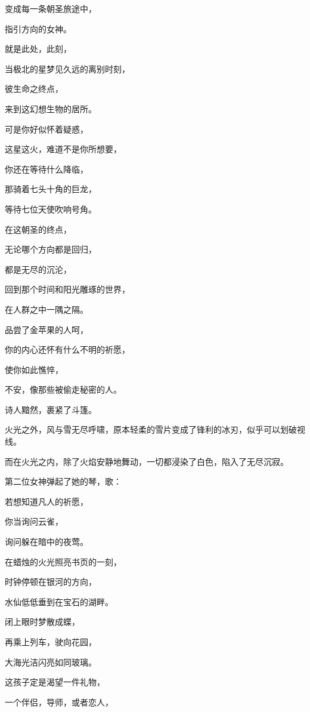 \documentclass[UTF8]{article}
\begin{document}
\par 变成每一条朝圣旅途中，
\par 指引方向的女神。
\par 就是此处，此刻，
\par 当极北的星梦见久远的离别时刻，
\par 彼生命之终点，
\par 来到这幻想生物的居所。
\par 可是你好似怀着疑惑，
\par 这星这火，难道不是你所想要，
\par 你还在等待什么降临，
\par 那骑着七头十角的巨龙，
\par 等待七位天使吹响号角。
\par 在这朝圣的终点，
\par 无论哪个方向都是回归，
\par 都是无尽的沉沦，
\par 回到那个时间和阳光雕琢的世界，
\par 在人群之中一隅之隔。
\par 品尝了金苹果的人呵，
\par 你的内心还怀有什么不明的祈愿，
\par 使你如此憔悴，
\par 不安，像那些被偷走秘密的人。
\\[0.6cm]
\par 诗人黯然，裹紧了斗篷。
\par 火光之外，风与雪无尽呼啸，原本轻柔的雪片变成了锋利的冰刃，似乎可以划破视线。
\par 而在火光之内，除了火焰安静地舞动，一切都浸染了白色，陷入了无尽沉寂。
\\[0.6cm]
\par 第二位女神弹起了她的琴，歌：
\\[0.6cm]
\par 若想知道凡人的祈愿，
\par 你当询问云雀，
\par 询问躲在暗中的夜莺。
\par 在蜡烛的火光照亮书页的一刻，
\par 时钟停顿在银河的方向，
\par 水仙低低垂到在宝石的湖畔。
\par 闭上眼时梦散成蝶，
\par 再乘上列车，驶向花园，
\par 大海光洁闪亮如同玻璃。
\par 这孩子定是渴望一件礼物，
\par 一个伴侣，导师，或者恋人，
\end{document}
